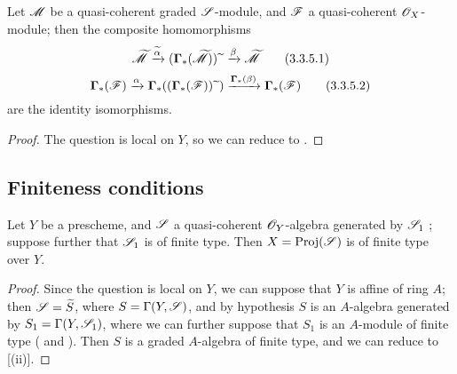 \begin{proposition}[3.3.5]
\label{II.3.3.5}
Let $\mathscr{M}$ be a quasi-coherent graded $\mathscr{S}$-module, and $\mathscr{F}$ a quasi-coherent $\mathscr{O}_X$-module;
then the composite homomorphisms
\[
\label{II.3.3.5.1}
  \widetilde{\mathscr{M}} \xrightarrow{\widetilde{\alpha}} (\boldsymbol\Gamma_*(\widetilde{\mathscr{M}})){\,\widetilde{\,}\,} \xrightarrow{\beta} \widetilde{\mathscr{M}}
\tag{3.3.5.1}
\]
\[
\label{II.3.3.5.2}
  \boldsymbol\Gamma_*(\mathscr{F}) \xrightarrow{\alpha} \boldsymbol\Gamma_*((\boldsymbol\Gamma_*(\mathscr{F})){\,\widetilde{\,}\,}) \xrightarrow{\boldsymbol\Gamma_*(\beta)} \boldsymbol\Gamma_*(\mathscr{F})
\tag{3.3.5.2}
\]
are the identity isomorphisms.
\end{proposition}

\begin{proof}
The question is local on $Y$, so we can reduce to .
\end{proof}


\subsection{Finiteness conditions}
\label{subsection:II.3.4}

\begin{proposition}[3.4.1]
\label{II.3.4.1}
Let $Y$ be a prescheme, and $\mathscr{S}$ a quasi-coherent $\mathscr{O}_Y$-algebra generated by $\mathscr{S}_1$ ;
suppose further that $\mathscr{S}_1$ is of finite type.
Then $X=\operatorname{Proj}(\mathscr{S})$ is of finite type over $Y$.
\end{proposition}

\begin{proof}
Since the question is local on $Y$, we can suppose that $Y$ is affine of ring $A$;
then $\mathscr{S}=\widetilde{S}$, where $S=\Gamma(Y,\mathscr{S})$, and by hypothesis $S$ is an $A$-algebra generated by $S_1=\Gamma(Y,\mathscr{S}_1)$, where we can further suppose that $S_1$ is an $A$-module of finite type ( and ).
Then $S$ is a graded $A$-algebra of finite type, and we can reduce to [(ii)].
\end{proof}

